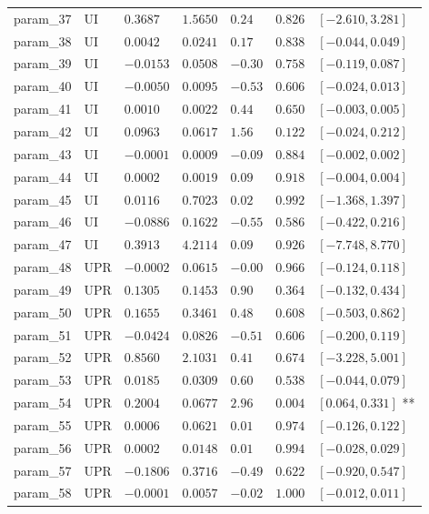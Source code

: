 \documentclass{article}
\begin{document}
\begin{longtable}{lllllll}
param\_37 & UI & $0.3687$ & $1.5650$ & $0.24$ & $0.826$ & $[-2.610, 3.281]$  \\
param\_38 & UI & $0.0042$ & $0.0241$ & $0.17$ & $0.838$ & $[-0.044, 0.049]$  \\
param\_39 & UI & $-0.0153$ & $0.0508$ & $-0.30$ & $0.758$ & $[-0.119, 0.087]$  \\
param\_40 & UI & $-0.0050$ & $0.0095$ & $-0.53$ & $0.606$ & $[-0.024, 0.013]$  \\
param\_41 & UI & $0.0010$ & $0.0022$ & $0.44$ & $0.650$ & $[-0.003, 0.005]$  \\
param\_42 & UI & $0.0963$ & $0.0617$ & $1.56$ & $0.122$ & $[-0.024, 0.212]$  \\
param\_43 & UI & $-0.0001$ & $0.0009$ & $-0.09$ & $0.884$ & $[-0.002, 0.002]$  \\
param\_44 & UI & $0.0002$ & $0.0019$ & $0.09$ & $0.918$ & $[-0.004, 0.004]$  \\
param\_45 & UI & $0.0116$ & $0.7023$ & $0.02$ & $0.992$ & $[-1.368, 1.397]$  \\
param\_46 & UI & $-0.0886$ & $0.1622$ & $-0.55$ & $0.586$ & $[-0.422, 0.216]$  \\
param\_47 & UI & $0.3913$ & $4.2114$ & $0.09$ & $0.926$ & $[-7.748, 8.770]$  \\
param\_48 & UPR & $-0.0002$ & $0.0615$ & $-0.00$ & $0.966$ & $[-0.124, 0.118]$  \\
param\_49 & UPR & $0.1305$ & $0.1453$ & $0.90$ & $0.364$ & $[-0.132, 0.434]$  \\
param\_50 & UPR & $0.1655$ & $0.3461$ & $0.48$ & $0.608$ & $[-0.503, 0.862]$  \\
param\_51 & UPR & $-0.0424$ & $0.0826$ & $-0.51$ & $0.606$ & $[-0.200, 0.119]$  \\
param\_52 & UPR & $0.8560$ & $2.1031$ & $0.41$ & $0.674$ & $[-3.228, 5.001]$  \\
param\_53 & UPR & $0.0185$ & $0.0309$ & $0.60$ & $0.538$ & $[-0.044, 0.079]$  \\
param\_54 & UPR & $0.2004$ & $0.0677$ & $2.96$ & $0.004$ & $[0.064, 0.331]$ ** \\
param\_55 & UPR & $0.0006$ & $0.0621$ & $0.01$ & $0.974$ & $[-0.126, 0.122]$  \\
param\_56 & UPR & $0.0002$ & $0.0148$ & $0.01$ & $0.994$ & $[-0.028, 0.029]$  \\
param\_57 & UPR & $-0.1806$ & $0.3716$ & $-0.49$ & $0.622$ & $[-0.920, 0.547]$  \\
param\_58 & UPR & $-0.0001$ & $0.0057$ & $-0.02$ & $1.000$ & $[-0.012, 0.011]$  \\

\end{longtable}
\end{document}
